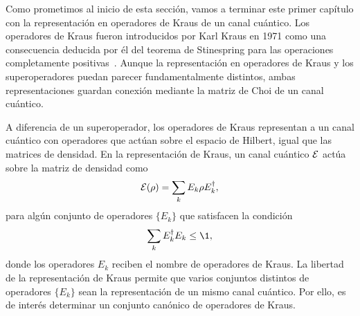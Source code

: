 Como prometimos al inicio de esta sección, vamos a terminar 
este primer capítulo con la representación en operadores de Kraus 
de un canal cuántico. Los operadores de Kraus fueron 
introducidos por Karl Kraus en 1971 como una consecuencia
deducida por él del teorema de Stinespring para las operaciones 
completamente positivas~\cite{bengtsson_zyczkowski_2017}. 
Aunque la representación en operadores de Kraus y los
superoperadores puedan parecer fundamentalmente distintos, 
ambas representaciones guardan conexión mediante 
la matriz de Choi de un canal cuántico.

A diferencia de un superoperador, los operadores de Kraus representan
a un canal cuántico con operadores que actúan sobre el espacio 
de Hilbert, igual que las matrices de densidad. En la representación 
de Kraus, un canal cuántico $\mathcal{E}$ actúa sobre la matriz 
de densidad como
\begin{align}\label{eq:KrausRepresentation}
\mathcal{E}\qty(\rho)=\sum_k E_k\rho E_k^{\dagger},
\end{align}
para algún conjunto de operadores $\{E_k\}$ que satisfacen la 
condición~\cite{nielsen_chuang_2011}
\begin{align}
\sum _kE_k^{\dagger}E_k\leq\1,
\end{align} 
donde los operadores $E_k$ reciben el nombre de operadores de Kraus.
La libertad de la representación de Kraus permite que 
varios conjuntos distintos de operadores $\{E_k\}$ sean la representación
de un mismo canal cuántico. Por ello, es de interés
determinar un conjunto canónico de operadores de Kraus.

